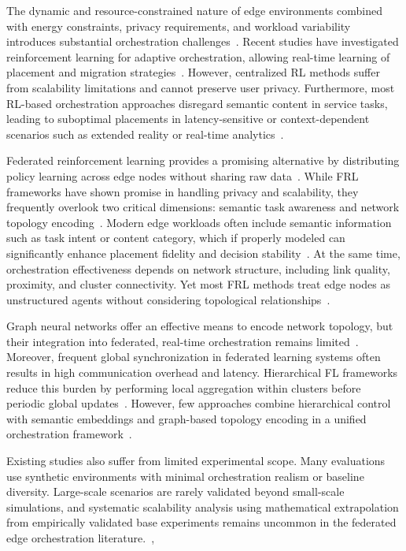 \documentclass[conference]{IEEEtran}
\begin{document}
		The dynamic and resource-constrained nature of edge environments combined with energy constraints, privacy requirements, and workload variability introduces substantial orchestration challenges~\cite{yang2023rlcs}. Recent studies have investigated reinforcement learning for adaptive orchestration, allowing real-time learning of placement and migration strategies~\cite{shi2023}. However, centralized RL methods suffer from scalability limitations and cannot preserve user privacy. Furthermore, most RL-based orchestration approaches disregard semantic content in service tasks, leading to suboptimal placements in latency-sensitive or context-dependent scenarios such as extended reality or real-time analytics~\cite{zhang2025semantic}.
		
		Federated reinforcement learning provides a promising alternative by distributing policy learning across edge nodes without sharing raw data~\cite{wu2024topology}. While FRL frameworks have shown promise in handling privacy and scalability, they frequently overlook two critical dimensions: semantic task awareness and network topology encoding~\cite{ogenyi2025comprehensive, zhang2024optimizing}. Modern edge workloads often include semantic information such as task intent or content category, which if properly modeled can significantly enhance placement fidelity and decision stability~\cite{zhang2025semantic}. At the same time, orchestration effectiveness depends on network structure, including link quality, proximity, and cluster connectivity. Yet most FRL methods treat edge nodes as unstructured agents without considering topological relationships~\cite{wu2024topology}.
		
		Graph neural networks offer an effective means to encode network topology, but their integration into federated, real-time orchestration remains limited~\cite{makris2024gnnrl, zhang2024optimizing}. Moreover, frequent global synchronization in federated learning systems often results in high communication overhead and latency. Hierarchical FL frameworks reduce this burden by performing local aggregation within clusters before periodic global updates~\cite{sad2024fearless, he2022acefl}. However, few approaches combine hierarchical control with semantic embeddings and graph-based topology encoding in a unified orchestration framework~\cite{wu2024topology, vahabi2025}.
		
		Existing studies also suffer from limited experimental scope. Many evaluations use synthetic environments with minimal orchestration realism or baseline diversity. Large-scale scenarios are rarely validated beyond small-scale simulations, and systematic scalability analysis using mathematical extrapolation from empirically validated base experiments remains uncommon in the federated edge orchestration literature.~\cite{yang2023rlcs, shi2023}, 
		
\end{document}
